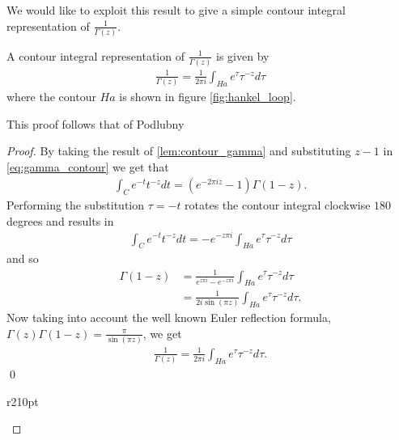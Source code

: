 We would like to exploit this result to give a simple contour integral representation of $ \frac{1}{\Gamma(z)} $.
\begin{mdframed}[innertopmargin=10pt]
\begin{lemma}
    \label{lem:contour_1_gamma_1}
    A contour integral representation of $ \frac{1}{\Gamma(z)} $ is given by
    \begin{align}
        \frac{1}{\Gamma(z)} = \frac{1}{2 \pi i} \int_{Ha} e^\tau \tau^{-z} d\tau
    \end{align}
    where the contour $ Ha $ is shown in figure \ref{fig:hankel_loop}.
\end{lemma}
\end{mdframed}
This proof follows that of Podlubny \cite{Podlubny1999}
\begin{proof}
    By taking the result of \ref{lem:contour_gamma} and substituting $ z-1 $ in \eqref{eq:gamma_contour}
    we get that
    \begin{align}
        \int_C e^{-t} t^{-z} dt = (e^{-2 \pi i z} -1) \Gamma(1-z).
    \end{align}
    Performing the substitution $ \tau = -t $ rotates the contour integral clockwise $ 180 $ degrees 
    and results in 
    \begin{align}
        \int_{C} e^{-t} t^{-z} dt = - e^{-z\pi i}\int_{Ha} e^{\tau} \tau^{-z} d\tau
    \end{align}
    and so
    \begin{align}
        \Gamma(1-z) &= \frac{1}{e^{z\pi i} - e^{-z \pi i}} \int_{Ha} e^\tau \tau^{-z} d\tau \\
            &= \frac{1}{2i \sin(\pi z)}\int_{Ha} e^\tau \tau^{-z} d\tau.
    \end{align}
    Now taking into account the well known Euler reflection formula, $ \Gamma(z)\Gamma(1-z) = \frac{\pi}{\sin(\pi z)} $, we get
    \begin{align}
        \frac{1}{\Gamma(z)} = \frac{1}{2 \pi i} \int_{Ha} e^\tau \tau^{-z} d\tau.
    \end{align} \qed
    \begin{wrapfigure}{r}{210pt}
        
        \caption{The Hankel contour Ha}
        \label{fig:hankel_loop}
    \end{wrapfigure}
\end{proof}

